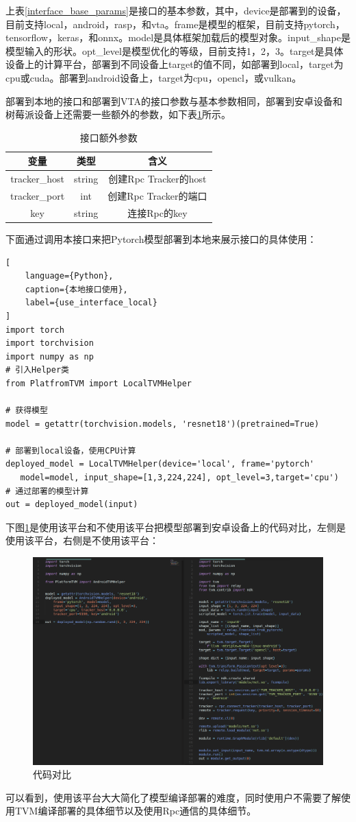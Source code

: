 上表\ref{interface_base_params}是接口的基本参数，其中，device是部署到的设备，目前支持local，android，rasp，和vta。frame是模型的框架，目前支持pytorch，tensorflow，keras，和onnx。model是具体框架加载后的模型对象。input\_shape是模型输入的形状。opt\_level是模型优化的等级，目前支持1，2，3。target是具体设备上的计算平台，部署到不同设备上target的值不同，如部署到local，target为cpu或cuda。部署到android设备上，target为cpu，opencl，或vulkan。

部署到本地的接口和部署到VTA的接口参数与基本参数相同，部署到安卓设备和树莓派设备上还需要一些额外的参数，如下表\ref{interface_extra_params}所示。

\begin{table}
    \centering
    \caption{接口额外参数}
    \label{interface_extra_params}
    \begin{tabular}{c|c|c}
        \hline
        变量            & 类型     & 含义                 \\ \hline
        tracker\_host & string & 创建Rpc Tracker的host \\ \hline
        tracker\_port & int    & 创建Rpc Tracker的端口   \\ \hline
        key           & string & 连接Rpc的key          \\ \hline
    \end{tabular}
\end{table}

下面通过调用本接口来把Pytorch模型部署到本地来展示接口的具体使用：

\begin{lstlisting}[
    language={Python},
    caption={本地接口使用},
    label={use_interface_local}
]
import torch
import torchvision
import numpy as np
# 引入Helper类
from PlatfromTVM import LocalTVMHelper

# 获得模型
model = getattr(torchvision.models, 'resnet18')(pretrained=True)

# 部署到local设备，使用CPU计算
deployed_model = LocalTVMHelper(device='local', frame='pytorch'
   model=model, input_shape=[1,3,224,224], opt_level=3,target='cpu')
# 通过部署的模型计算
out = deployed_model(input)
\end{lstlisting}

下图\ref{compare}是使用该平台和不使用该平台把模型部署到安卓设备上的代码对比，左侧是使用该平台，右侧是不使用该平台：

\begin{figure}[h!]
    \centering
    \includegraphics[width=270bp]{figure/compare.png}
    \caption{代码对比}
    \label{compare}
\end{figure}

可以看到，使用该平台大大简化了模型编译部署的难度，同时使用户不需要了解使用TVM编译部署的具体细节以及使用Rpc通信的具体细节。